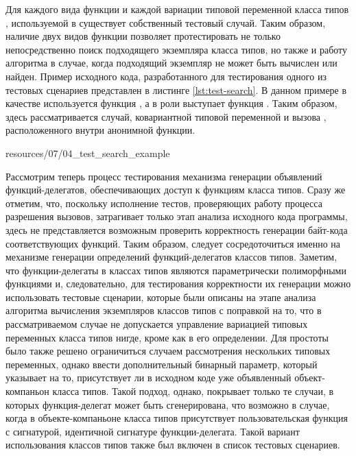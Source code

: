 Для каждого вида функции  и каждой вариации типовой переменной класса типов , используемой в  существует собственный тестовый случай. Таким образом, наличие двух видов функции  позволяет протестировать не только непосредственно поиск подходящего экземпляра класса типов, но также и работу алгоритма в случае, когда подходящий экземпляр не может быть вычислен или найден. Пример исходного кода, разработанного для тестирования одного из тестовых сценариев представлен в листинге \ref{lst:test-search}. В данном примере в качестве  используется функция , а в роли  выступает функция . Таким образом, здесь рассматривается случай, ковариантной типовой переменной и вызова , расположенного внутри анонимной функции.  


{resources/07/04_test_search_example}  

Рассмотрим теперь процесс тестирования механизма генерации объявлений функций-делегатов, обеспечивающих доступ к функциям класса типов. Сразу же отметим, что, поскольку исполнение тестов, проверяющих работу процесса разрешения вызовов, затрагивает только этап анализа исходного кода программы, здесь не представляется возможным проверить корректность генерации байт-кода соответствующих функций. Таким образом, следует сосредоточиться именно на механизме генерации определений функций-делегатов классов типов. Заметим, что функции-делегаты в классах типов являются параметрически полиморфными функциями и, следовательно, для тестирования корректности их генерации можно использовать тестовые сценарии, которые были описаны на этапе анализа алгоритма вычисления экземпляров классов типов с поправкой на то, что в рассматриваемом случае не допускается управление вариацией типовых переменных класса типов нигде, кроме как в его определении. Для простоты было также решено ограничиться случаем рассмотрения нескольких типовых переменных, однако ввести дополнительный бинарный параметр, который указывает на то, присутствует ли в исходном коде уже объявленный объект-компаньон класса типов. Такой подход, однако, покрывает только те случаи, в которых функция-делегат может быть сгенерирована, что возможно в случае, когда в объекте-компаньоне класса типов присутствует пользовательская функция с сигнатурой, идентичной сигнатуре функции-делегата. Такой вариант использования классов типов также был включен в список тестовых сценариев. 

